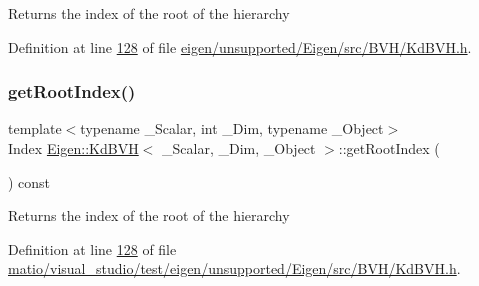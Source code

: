 \begin{DoxyReturn}{Returns}
the index of the root of the hierarchy 
\end{DoxyReturn}


Definition at line \hyperlink{eigen_2unsupported_2_eigen_2src_2_b_v_h_2_kd_b_v_h_8h_source_l00128}{128} of file \hyperlink{eigen_2unsupported_2_eigen_2src_2_b_v_h_2_kd_b_v_h_8h_source}{eigen/unsupported/\+Eigen/src/\+B\+V\+H/\+Kd\+B\+V\+H.\+h}.

\mbox{\label{class_eigen_1_1_kd_b_v_h_a8111486ece7980dd8f0d10aff9693d11}} 
\subsubsection{\texorpdfstring{get\+Root\+Index()}{getRootIndex()}\hspace{0.1cm}{\footnotesize\ttfamily [2/2]}}
{\footnotesize\ttfamily template$<$typename \+\_\+\+Scalar, int \+\_\+\+Dim, typename \+\_\+\+Object$>$ \\
Index \hyperlink{class_eigen_1_1_kd_b_v_h}{Eigen\+::\+Kd\+B\+VH}$<$ \+\_\+\+Scalar, \+\_\+\+Dim, \+\_\+\+Object $>$\+::get\+Root\+Index (\begin{DoxyParamCaption}{ }\end{DoxyParamCaption}) const\hspace{0.3cm}{\ttfamily [inline]}}

\begin{DoxyReturn}{Returns}
the index of the root of the hierarchy 
\end{DoxyReturn}


Definition at line \hyperlink{matio_2visual__studio_2test_2eigen_2unsupported_2_eigen_2src_2_b_v_h_2_kd_b_v_h_8h_source_l00128}{128} of file \hyperlink{matio_2visual__studio_2test_2eigen_2unsupported_2_eigen_2src_2_b_v_h_2_kd_b_v_h_8h_source}{matio/visual\+\_\+studio/test/eigen/unsupported/\+Eigen/src/\+B\+V\+H/\+Kd\+B\+V\+H.\+h}.

\mbox{\label{class_eigen_1_1_kd_b_v_h_a59e7a2afb19fe7ae919fb95425bd6bf0}} 
